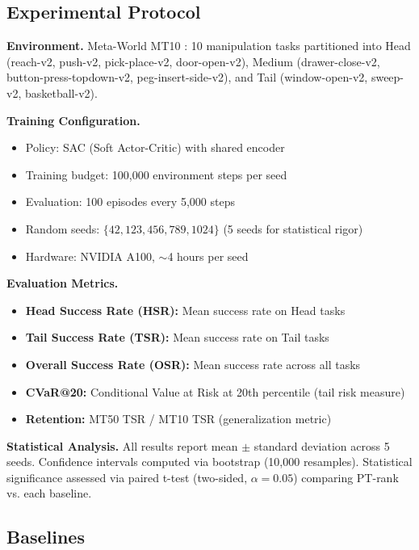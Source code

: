 \documentclass[11pt, a4paper, oneside]{article}
\theoremstyle{plain}
\theoremstyle{break}
\theoremstyle{plain}
\theoremstyle{breakdef}
\theoremstyle{plain}
\theoremstyle{breakrem}
\theoremstyle{plain}
\theoremstyle{breakrem}
\begin{document}
\subsection{Experimental Protocol}

\textbf{Environment.} Meta-World MT10 \cite{yu2019metaworld}: 10 manipulation tasks partitioned into Head (reach-v2, push-v2, pick-place-v2, door-open-v2), Medium (drawer-close-v2, button-press-topdown-v2, peg-insert-side-v2), and Tail (window-open-v2, sweep-v2, basketball-v2).

\textbf{Training Configuration.}
\begin{itemize}
    \item Policy: SAC (Soft Actor-Critic) with shared encoder
    \item Training budget: 100,000 environment steps per seed
    \item Evaluation: 100 episodes every 5,000 steps
    \item Random seeds: $\{42, 123, 456, 789, 1024\}$ (5 seeds for statistical rigor)
    \item Hardware: NVIDIA A100, $\sim$4 hours per seed
\end{itemize}

\textbf{Evaluation Metrics.}
\begin{itemize}
    \item \textbf{Head Success Rate (HSR):} Mean success rate on Head tasks
    \item \textbf{Tail Success Rate (TSR):} Mean success rate on Tail tasks
    \item \textbf{Overall Success Rate (OSR):} Mean success rate across all tasks
    \item \textbf{CVaR@20:} Conditional Value at Risk at 20th percentile (tail risk measure)
    \item \textbf{Retention:} MT50 TSR / MT10 TSR (generalization metric)
\end{itemize}

\textbf{Statistical Analysis.} All results report mean $\pm$ standard deviation across 5 seeds. Confidence intervals computed via bootstrap (10,000 resamples). Statistical significance assessed via paired t-test (two-sided, $\alpha=0.05$) comparing PT-rank vs. each baseline.

\subsection{Baselines}
\label{sec:baselines}
\end{document}
